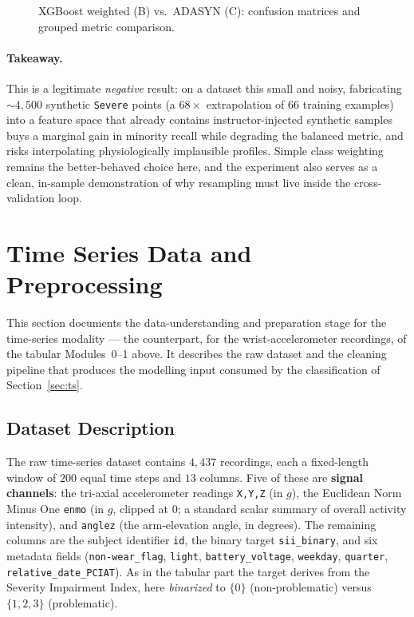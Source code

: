 \begin{figure}[h]
    \centering
    \caption{XGBoost weighted (B) vs.\ ADASYN (C): confusion matrices and grouped metric comparison.}
    \label{fig:cmi_adasyn}
\end{figure}

\paragraph{Takeaway.} This is a legitimate \emph{negative} result: on a dataset this small and noisy, fabricating $\sim 4{,}500$ synthetic \texttt{Severe} points (a $68\times$ extrapolation of $66$ training examples) into a feature space that already contains instructor-injected synthetic samples buys a marginal gain in minority recall while degrading the balanced metric, and risks interpolating physiologically implausible profiles. Simple class weighting remains the better-behaved choice here, and the experiment also serves as a clean, in-sample demonstration of why resampling must live inside the cross-validation loop.

\section{Time Series Data and Preprocessing}
\label{sec:ts_prep}
This section documents the data-understanding and preparation stage for the time-series modality --- the counterpart, for the wrist-accelerometer recordings, of the tabular Modules~0--1 above. It describes the raw dataset and the cleaning pipeline that produces the modelling input consumed by the classification of Section~\ref{sec:ts}.

\subsection{Dataset Description}
The raw time-series dataset \cite{cmi} contains $4{,}437$ recordings, each a fixed-length window of $200$ equal time steps and $13$ columns. Five of these are \textbf{signal channels}: the tri-axial accelerometer readings \texttt{X,Y,Z} (in $g$), the Euclidean Norm Minus One \texttt{enmo} (in $g$, clipped at $0$; a standard scalar summary of overall activity intensity), and \texttt{anglez} (the arm-elevation angle, in degrees). The remaining columns are the subject identifier \texttt{id}, the binary target \texttt{sii\_binary}, and six metadata fields (\texttt{non-wear\_flag}, \texttt{light}, \texttt{battery\_voltage}, \texttt{weekday}, \texttt{quarter}, \texttt{relative\_date\_PCIAT}). As in the tabular part the target derives from the Severity Impairment Index, here \emph{binarized} to $\{0\}$ (non-problematic) versus $\{1,2,3\}$ (problematic).

